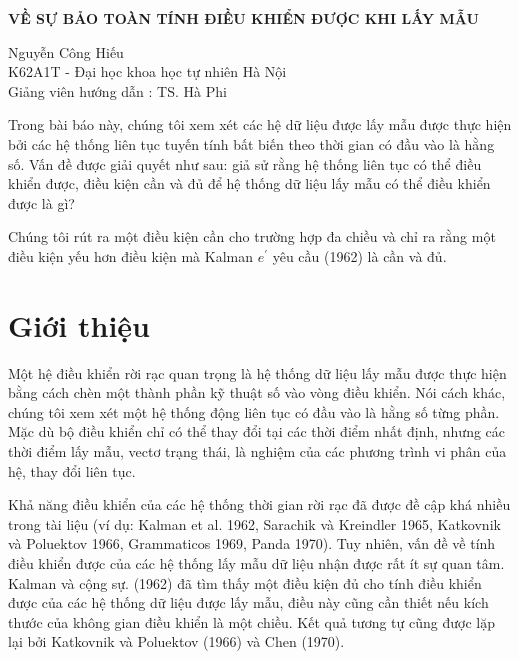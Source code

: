 \documentclass[12pt,a4paper]{article}
\begin{document}
\vspace*{5cm}
\begin{center}
	\textbf{{\Large VỀ SỰ BẢO TOÀN TÍNH ĐIỀU KHIỂN ĐƯỢC KHI LẤY MẪU}  }  
\end{center}  

\begin{center}
	Nguyễn Công Hiếu \\ K62A1T - Đại học khoa học tự nhiên Hà Nội \\ Giảng viên hướng dẫn : TS. Hà Phi 
\end{center}  
       

\newpage

\tableofcontents %
	 
\newpage
		 
Trong bài báo này, chúng tôi xem xét các hệ dữ liệu được lấy mẫu được thực hiện bởi các hệ thống liên tục tuyến tính bất biến theo thời gian có đầu vào là hằng số. Vấn đề được giải quyết như sau: giả sử rằng hệ thống liên tục có thể điều khiển được, điều kiện cần và đủ để hệ thống dữ liệu lấy mẫu có thể điều khiển được là gì?

Chúng tôi rút ra một điều kiện cần cho trường hợp đa chiều và chỉ ra rằng một điều kiện yếu hơn điều kiện mà Kalman $e^{\prime}$ yêu cầu (1962) là cần và đủ.



\section{Giới thiệu}

Một hệ điều khiển rời rạc quan trọng là hệ thống dữ liệu lấy mẫu được thực hiện bằng cách chèn một thành phần kỹ thuật số vào vòng điều khiển. Nói cách khác, chúng tôi xem xét một hệ thống động liên tục có đầu vào là hằng số từng phần. Mặc dù bộ điều khiển chỉ có thể thay đổi tại các thời điểm nhất định, nhưng các thời điểm lấy mẫu, vectơ trạng thái, là nghiệm của các phương trình vi phân của hệ, thay đổi liên tục.

Khả năng điều khiển của các hệ thống thời gian rời rạc đã được đề cập khá nhiều trong tài liệu (ví dụ: Kalman et al. 1962, Sarachik và Kreindler 1965, Katkovnik và Poluektov 1966, Grammaticos 1969, Panda 1970). Tuy nhiên, vấn đề về tính điều khiển được của các hệ thống lấy mẫu dữ liệu nhận được rất ít sự quan tâm. Kalman và cộng sự. (1962) đã tìm thấy một điều kiện đủ cho tính điều khiển được của các hệ thống dữ liệu được lấy mẫu, điều này cũng cần thiết nếu kích thước của không gian điều khiển là một chiều. Kết quả tương tự cũng được lặp lại bởi Katkovnik và Poluektov (1966) và Chen (1970).
\end{document}
